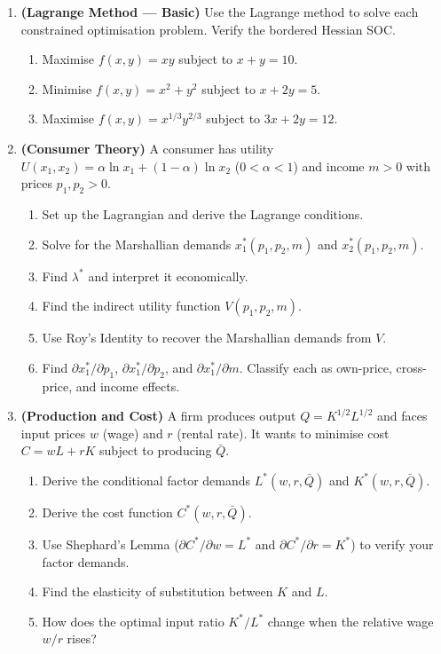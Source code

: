 \documentclass[12pt, a4paper]{article}
\theoremstyle{definition}
\begin{document}
\begin{enumerate}[label=\textbf{B\arabic*.}, leftmargin=2.5em]

\item \textbf{(Lagrange Method --- Basic)}
Use the Lagrange method to solve each constrained optimisation problem.
Verify the bordered Hessian SOC.
\begin{enumerate}[label=(\alph*)]
  \item Maximise $f(x,y) = xy$ subject to $x + y = 10$.
  \item Minimise $f(x,y) = x^2 + y^2$ subject to $x + 2y = 5$.
  \item Maximise $f(x,y) = x^{1/3}y^{2/3}$ subject to $3x+2y=12$.
\end{enumerate}

\item \textbf{(Consumer Theory)}
A consumer has utility $U(x_1, x_2) = \alpha\ln x_1 + (1-\alpha)\ln x_2$
($0<\alpha<1$) and income $m > 0$ with prices $p_1, p_2 > 0$.
\begin{enumerate}[label=(\alph*)]
  \item Set up the Lagrangian and derive the Lagrange conditions.
  \item Solve for the Marshallian demands $x_1^*(p_1,p_2,m)$ and
        $x_2^*(p_1,p_2,m)$.
  \item Find $\lambda^*$ and interpret it economically.
  \item Find the indirect utility function $V(p_1,p_2,m)$.
  \item Use Roy's Identity to recover the Marshallian demands from $V$.
  \item Find $\partial x_1^*/\partial p_1$, $\partial x_1^*/\partial p_2$,
        and $\partial x_1^*/\partial m$. Classify each as own-price,
        cross-price, and income effects.
\end{enumerate}

\item \textbf{(Production and Cost)}
A firm produces output $Q = K^{1/2}L^{1/2}$ and faces input prices
$w$ (wage) and $r$ (rental rate). It wants to minimise cost
$C = wL + rK$ subject to producing $\bar Q$.
\begin{enumerate}[label=(\alph*)]
  \item Derive the conditional factor demands $L^*(w,r,\bar Q)$
        and $K^*(w,r,\bar Q)$.
  \item Derive the cost function $C^*(w,r,\bar Q)$.
  \item Use Shephard's Lemma ($\partial C^*/\partial w = L^*$ and
        $\partial C^*/\partial r = K^*$) to verify your factor demands.
  \item Find the elasticity of substitution between $K$ and $L$.
  \item How does the optimal input ratio $K^*/L^*$ change when the
        relative wage $w/r$ rises?
\end{enumerate}


\end{enumerate}
\end{document}
